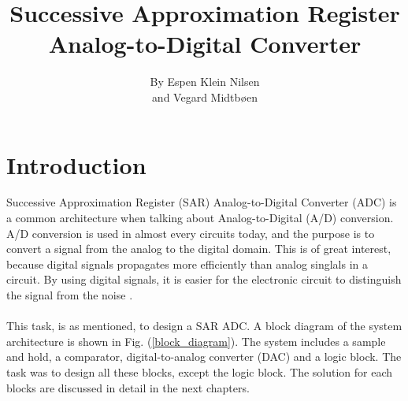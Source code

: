 \documentclass[english, 12pt, a4paper]{ifimaster}
\title{ \huge{Successive Approximation Register Analog-to-Digital Converter}}
\author{By Espen Klein Nilsen\\ and Vegard Midtbøen}
\begin{document}
\ififorside{}
 \frontmatter{}
\maketitle{} \newpage

\tableofcontents{} \newpage
\listoffigures{} 
\listoftables{} \newpage


 \mainmatter{}        

\chapter{Introduction} 
Successive Approximation Register (SAR) Analog-to-Digital Converter (ADC) is a common architecture when talking about Analog-to-Digital (A/D) conversion. A/D conversion is used in almost every
circuits today, and the purpose is to convert a signal from the analog to the digital domain. This is of great interest, because digital signals propagates more efficiently than analog singlals in a 
circuit. By using digital signals, it is easier for the electronic circuit to distinguish the signal from the noise \cite{basic-adc}.\\
\\
This task, is as mentioned, to design a SAR ADC. A block diagram of the system architecture is shown in Fig. (\ref{block_diagram}). The system includes a sample and hold, a comparator, digital-to-analog 
converter (DAC) and a logic block. The task was to design all these blocks, except the logic block. The solution for each blocks are discussed in detail in the next chapters.  
\end{document}
